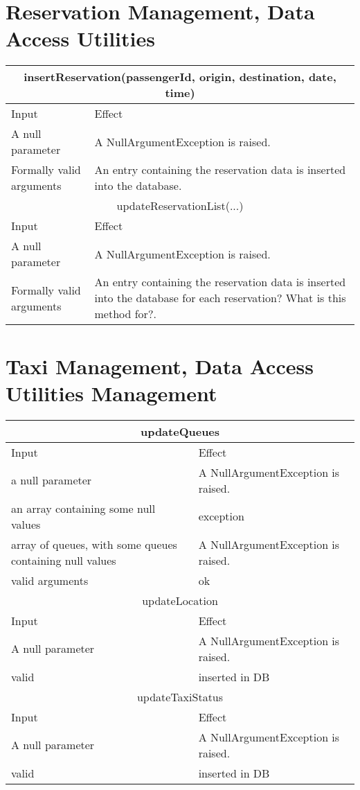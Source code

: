 \documentclass[11pt,oneside,a4paper]{report}
\begin{document}
\section{Reservation Management, Data Access Utilities}
\begin{table}[ph]
\centering
\begin{tabular}{p{5cm}|p{6cm}}
	\hline
	\multicolumn{2}{c}{insertReservation(passengerId, origin, destination, date, time)}\\\hline\hline
	Input & Effect \\\hline
	A null parameter &
	A NullArgumentException is raised.\\\hline
	Formally valid arguments &
	An entry containing the reservation data is inserted into the database.\\\hline\hline
	
	\multicolumn{2}{c}{updateReservationList(...)}\\\hline\hline
	Input & Effect \\\hline
	A null parameter &
	A NullArgumentException is raised. \\\hline
	Formally valid arguments &
	An entry containing the reservation data is inserted into the database for each reservation? What is this method for?.\\\hline
\end{tabular}
\end{table}


\section{Taxi Management, Data Access Utilities Management}
\begin{tabular}{p{5cm}|p{6cm}}
	\hline
	\multicolumn{2}{c}{updateQueues}\\\hline
	Input & Effect \\\hline
	a null parameter &
	A NullArgumentException is raised. \\\hline
	an array containing some null values &
	exception\\\hline
	array of queues, with some queues containing null values &
	A NullArgumentException is raised. \\\hline
	valid arguments &
	ok \\\hline\hline
	
	\multicolumn{2}{c}{updateLocation}\\\hline
	Input & Effect \\\hline
	A null parameter &
	A NullArgumentException is raised. \\\hline
	valid &
	inserted in DB \\\hline\hline
	
	\multicolumn{2}{c}{updateTaxiStatus}\\\hline
	Input & Effect \\\hline
	A null parameter &
	A NullArgumentException is raised. \\\hline
	valid &
	inserted in DB \\\hline
\end{tabular}
\end{document}
